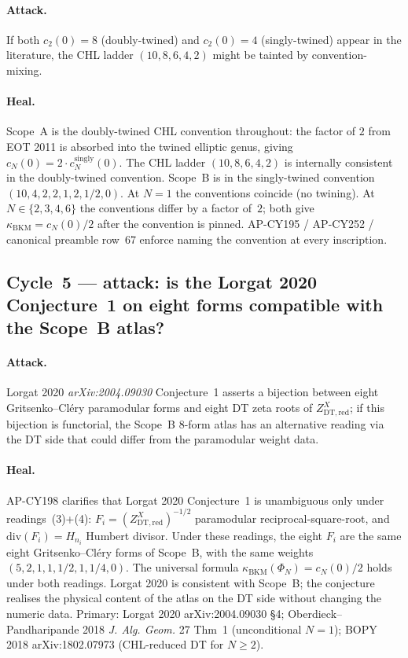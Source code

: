 \documentclass[11pt]{article}
\providecommand{\kBKM}{\kappa_{\mathrm{BKM}}}
\theoremstyle{definition}
\begin{document}
\paragraph{Attack.}
If both $c_2(0) = 8$ (doubly-twined) and $c_2(0) = 4$ (singly-twined)
appear in the literature, the CHL ladder $(10, 8, 6, 4, 2)$ might
be tainted by convention-mixing.

\paragraph{Heal.}
Scope~A is the doubly-twined CHL convention throughout: the factor of
$2$ from EOT 2011 is absorbed into the twined elliptic genus, giving
$c_N(0) = 2 \cdot c_N^{\mathrm{singly}}(0)$. The CHL ladder
$(10, 8, 6, 4, 2)$ is internally consistent in the doubly-twined
convention. Scope~B is in the singly-twined convention
$(10, 4, 2, 2, 1, 2, 1/2, 0)$. At $N = 1$ the conventions coincide
(no twining). At $N \in \{2, 3, 4, 6\}$ the conventions differ by a
factor of~$2$; both give $\kBKM = c_N(0)/2$ after the convention is
pinned. AP-CY195 / AP-CY252 / canonical preamble row~67 enforce
naming the convention at every inscription.

\subsection{Cycle~5 --- attack: is the Lorgat 2020 Conjecture~1 on
eight forms compatible with the Scope~B atlas?}

\paragraph{Attack.}
Lorgat 2020 \emph{arXiv:2004.09030} Conjecture~1 asserts a bijection
between eight Gritsenko--Cl\'ery paramodular forms and eight DT zeta
roots of $Z^X_{\mathrm{DT}, \mathrm{red}}$; if this bijection is
functorial, the Scope~B 8-form atlas has an alternative reading via
the DT side that could differ from the paramodular weight data.

\paragraph{Heal.}
AP-CY198 clarifies that Lorgat 2020 Conjecture~1 is unambiguous only
under readings~(3)+(4): $F_i = (Z^X_{\mathrm{DT}, \mathrm{red}})^{-1/2}$
paramodular reciprocal-square-root, and
$\mathrm{div}(F_i) = H_{n_i}$ Humbert divisor. Under these readings,
the eight $F_i$ are the same eight Gritsenko--Cl\'ery forms of
Scope~B, with the same weights $(5, 2, 1, 1, 1/2, 1, 1/4, 0)$. The
universal formula $\kBKM(\Phi_N) = c_N(0)/2$ holds under both
readings. Lorgat 2020 is consistent with Scope~B; the conjecture
realises the physical content of the atlas on the DT side without
changing the numeric data. Primary: Lorgat 2020 arXiv:2004.09030
\S 4; Oberdieck--Pandharipande 2018 \emph{J. Alg. Geom.} 27 Thm~1
(unconditional $N = 1$); BOPY 2018 arXiv:1802.07973
(CHL-reduced DT for $N \geq 2$).
\end{document}
